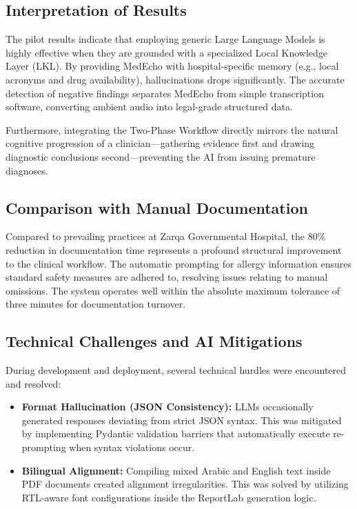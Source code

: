 \documentclass[12pt,a4paper]{article}
\begin{document}
\subsection{Interpretation of Results}
The pilot results indicate that employing generic Large Language Models is highly effective when they are grounded with a specialized Local Knowledge Layer (LKL). By providing MedEcho with hospital-specific memory (e.g., local acronyms and drug availability), hallucinations drops significantly. The accurate detection of negative findings separates MedEcho from simple transcription software, converting ambient audio into legal-grade structured data.

Furthermore, integrating the Two-Phase Workflow directly mirrors the natural cognitive progression of a clinician—gathering evidence first and drawing diagnostic conclusions second—preventing the AI from issuing premature diagnoses.

\subsection{Comparison with Manual Documentation}
Compared to prevailing practices at Zarqa Governmental Hospital, the 80\% reduction in documentation time represents a profound structural improvement to the clinical workflow. The automatic prompting for allergy information ensures standard safety measures are adhered to, resolving issues relating to manual omissions. The system operates well within the absolute maximum tolerance of three minutes for documentation turnover.

\subsection{Technical Challenges and AI Mitigations}
During development and deployment, several technical hurdles were encountered and resolved:
\begin{itemize}
    \item \textbf{Format Hallucination (JSON Consistency):} LLMs occasionally generated responses deviating from strict JSON syntax. This was mitigated by implementing Pydantic validation barriers that automatically execute re-prompting when syntax violations occur.
    \item \textbf{Bilingual Alignment:} Compiling mixed Arabic and English text inside PDF documents created alignment irregularities. This was solved by utilizing RTL-aware font configurations inside the ReportLab generation logic.
\end{itemize}
\end{document}
